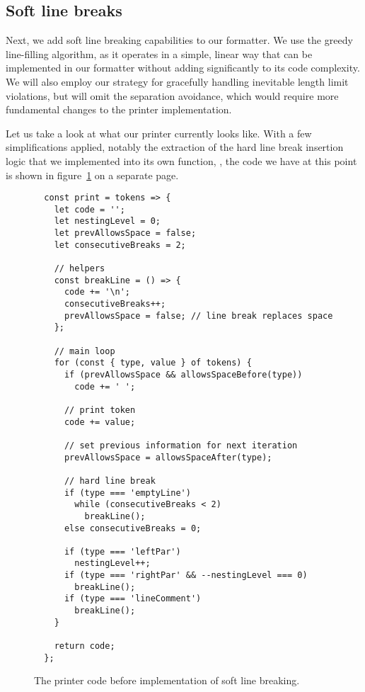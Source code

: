 \subsection{Soft line breaks}
Next, we add soft line breaking capabilities to our formatter.
We use the greedy line-filling algorithm,
as it operates in a simple, linear way
that can be implemented in our formatter without
adding significantly to its code complexity.
We will also employ our strategy for
gracefully handling inevitable length limit violations,
but will omit the separation avoidance,
which would require more fundamental changes
to the printer implementation.

Let us take a look at what our printer currently looks like.
With a few simplifications applied,
notably the extraction of the hard line break insertion logic
that we implemented into its own function, ,
the code we have at this point is shown
in figure~\ref{fig:printerBeforeSoftLineBreaks} on a separate page.

\begin{figure}[p]
  \begin{verbatim}
  const print = tokens => {
    let code = '';
    let nestingLevel = 0;
    let prevAllowsSpace = false;
    let consecutiveBreaks = 2;

    // helpers
    const breakLine = () => {
      code += '\n';
      consecutiveBreaks++;
      prevAllowsSpace = false; // line break replaces space
    };

    // main loop
    for (const { type, value } of tokens) {
      if (prevAllowsSpace && allowsSpaceBefore(type))
        code += ' ';

      // print token
      code += value;

      // set previous information for next iteration
      prevAllowsSpace = allowsSpaceAfter(type);

      // hard line break
      if (type === 'emptyLine')
        while (consecutiveBreaks < 2)
          breakLine();
      else consecutiveBreaks = 0;

      if (type === 'leftPar')
        nestingLevel++;
      if (type === 'rightPar' && --nestingLevel === 0)
        breakLine();
      if (type === 'lineComment')
        breakLine();
    }

    return code;
  };
  \end{verbatim}
  \caption{The printer code before implementation of
    soft line breaking.}\label{fig:printerBeforeSoftLineBreaks}
\end{figure}

